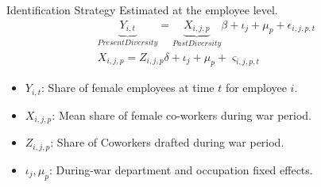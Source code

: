 \begin{frame}{Identification Strategy}
Estimated at the employee level.
\begin{gather*}
\underbrace{Y_{i,t}}_{Present Diversity} = \underbrace{X_{i,j,p}}_{Past Diversity} \beta + \iota_j + \mu_p + \epsilon_{i,j,p,t} \\
    X_{i,j,p} = Z_{i,j,p} \delta + \iota_j + \mu_p + \varsigma_{i,j,p,t}
\end{gather*}
\begin{itemize}
    \item \( Y_{i,t} \): Share of female employees at time \(t\) for employee $i$.
    \item \( X_{i,j,p} \): Mean share of female co-workers during war period.
    \item \( Z_{i,j,p} \): Share of Coworkers drafted during war period.
    \item \( \iota_j, \mu_p\): During-war department and occupation fixed effects.
\end{itemize}
\end{frame}

